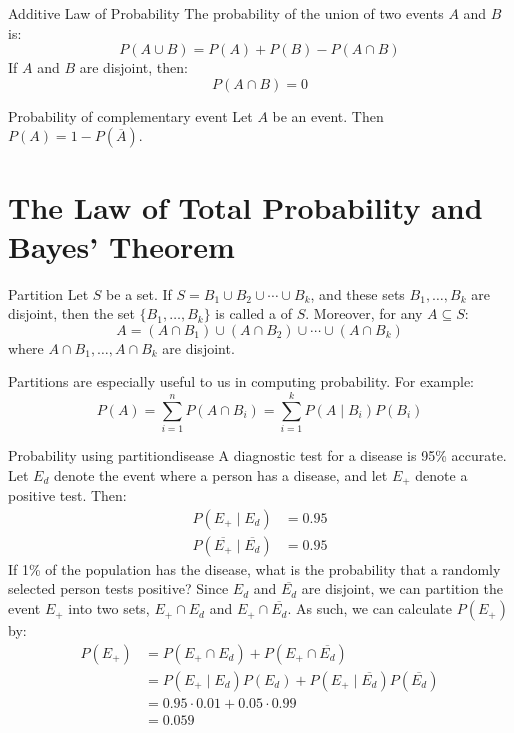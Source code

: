 \begin{thmbox}{Additive Law of Probability}{}
    The probability of the union of two events $A$ and $B$ is:
    \[ P(A \cup B) = P(A) + P(B) - P(A \cap B) \]
    If $A$ and $B$ are disjoint, then:
    \[ P(A \cap B) = 0 \] 
\end{thmbox}

\begin{thmbox}{Probability of complementary event}{}
    Let $A$ be an event. Then $P(A) = 1 - P(\overline{A})$.
\end{thmbox}

\section{The Law of Total Probability and Bayes' Theorem}

\begin{dfnbox}{Partition}{}
    Let $S$ be a set. If $S = B_1 \cup B_2 \cup \cdots \cup B_k$, and these sets $B_1, \ldots, B_k$ are disjoint, then the set $\{ B_1, \ldots, B_k \}$ is called a  of $S$. Moreover, for any $A \subseteq S$:
    \[ A = (A \cap B_1) \cup (A \cap B_2) \cup \cdots \cup (A \cap B_k) \]
    where $A \cap B_1, \ldots, A \cap B_k$ are disjoint.    
\end{dfnbox}

Partitions are especially useful to us in computing probability. For example:
\[ P(A) = \sum_{i=1}^{n} P(A \cap B_i) = \sum_{i=1}^{k} P(A \mid B_i) P(B_i) \]

\begin{exbox}{Probability using partition}{disease}
    A diagnostic test for a disease is 95\% accurate. Let $E_d$ denote the event where a person has a disease, and let $E_+$ denote a positive test. Then:
    \begin{align*}
        P(E_+ \mid E_d) &= 0.95 \\
        P(\overline{E_+} \mid \overline{E_d}) &= 0.95
    \end{align*}
    If 1\% of the population has the disease, what is the probability that a randomly selected person tests positive?
    \tcblower
    Since $E_d$ and $\overline{E_d}$ are disjoint, we can partition the event $E_+$ into two sets, $E_+ \cap E_d$ and $E_+ \cap \overline{E_d}$. As such, we can calculate $P(E_+)$ by:
    \begin{align*}
        P(E_+)
        &= P(E_+ \cap E_d) + P(E_+ \cap \overline{E_d}) \\
        &= P(E_+ \mid E_d) P(E_d) + P(E_+ \mid \overline{E_d}) P (\overline{E_d}) \\
        &= 0.95 \cdot 0.01 + 0.05 \cdot 0.99 \\
        &= 0.059
    \end{align*}
\end{exbox}


